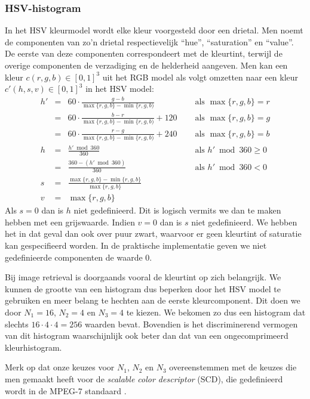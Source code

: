 \subsubsection{HSV-histogram}

In het HSV kleurmodel wordt elke kleur voorgesteld door een drietal. Men noemt de componenten van 
zo'n drietal respectievelijk ``hue'', ``saturation'' en ``value''. De eerste van deze componenten
correspondeert met de kleurtint, terwijl de overige componenten de verzadiging en de helderheid
aangeven. Men kan een kleur $c(r,g,b) \in [0,1]^3$ uit het RGB model als volgt omzetten naar een 
kleur $c'(h,s,v) \in [0,1]^3$ in het HSV model:
$$
\begin{array}{rcll}
h' & = & 60 \cdot \frac{g - b}{\max \{r,g,b\} - \min \{r,g,b)}\quad & \textrm{ als } \max \{r,g,b\} = r \\[2pt]
  & = & 60 \cdot \frac{b - r}{\max \{r,g,b\} - \min \{r,g,b)} + 120\quad & \textrm{ als } \max \{r,g,b\} = g \\[2pt]
  & = & 60 \cdot \frac{r - g}{\max \{r,g,b\} - \min \{r,g,b)} + 240\quad & \textrm{ als } \max \{r,g,b\} = b \\[6pt]
h & = & \frac{h' \bmod 360}{360} & \textrm{ als } h' \bmod 360 \geq 0 \\[2pt]
  & = & \frac{360 - (h' \bmod 360)}{360} & \textrm{ als } h' \bmod 360 < 0 \\[6pt]
s & = & \frac{\max \{r,g,b\} - \min \{r,g,b\}}{\max \{r,g,b\}} & \\[6pt]
v & = & \max \{r,g,b\}
\end{array}
$$
Als $s=0$ dan is $h$ niet gedefinieerd. Dit is logisch vermits we dan te maken hebben met een 
grijswaarde. Indien $v=0$ dan is $s$ niet gedefinieerd. We hebben het in dat geval dan ook over 
puur zwart, waarvoor er geen kleurtint of saturatie kan gespecifieerd worden. In de praktische
implementatie geven we niet gedefinieerde componenten de waarde 0.

Bij image retrieval is doorgaands vooral de kleurtint op zich belangrijk. We kunnen de grootte van
een histogram dus beperken door het HSV model te gebruiken en meer belang te hechten aan de
eerste kleurcomponent. Dit doen we door $N_1=16$, $N_2=4$ en $N_3=4$ te kiezen. We bekomen zo dus
een histogram dat slechts $16 \cdot 4 \cdot 4 = 256$ waarden bevat. Bovendien is het discriminerend
vermogen van dit histogram waarschijnlijk ook beter dan dat van een ongecomprimeerd kleurhistogram.

Merk op dat onze keuzes voor $N_1$, $N_2$ en $N_3$ overeenstemmen met de keuzes die men gemaakt
heeft voor de \emph{scalable color descriptor} (SCD), die gedefinieerd wordt in de MPEG-7
standaard \cite{manjunath:color_and_texture_descriptors}.

